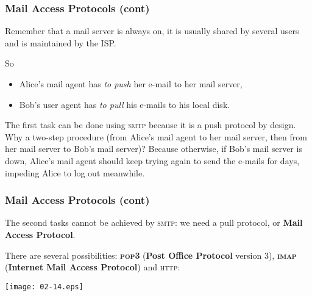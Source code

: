 %
\begin{frame}
\frametitle{Mail Access Protocols (cont)}

Remember that a mail server is always on, it is usually shared by
several users and is maintained by the ISP.

So
\begin{itemize}

  \item Alice's mail agent has \emph{to push} her e-mail to her mail
  server,

  \item Bob's user agent has \emph{to pull} his e-mails to his local
  disk.

\end{itemize}

The first task can be done using \textsc{smtp} because it is a push
protocol by design. Why a two-step procedure (from Alice's mail agent
to her mail server, then from her mail server to Bob's mail server)?
Because otherwise, if Bob's mail server is down, Alice's mail agent
should keep trying again to send the e-mails for days, impeding Alice
to log out meanwhile.

\end{frame}

%
\begin{frame}
\frametitle{Mail Access Protocols (cont)}

The second tasks cannot be achieved by \textsc{smtp}: we need a pull
protocol, or \textbf{Mail Access Protocol}.

There are several possibilities: \textbf{\textsc{pop3}} (\textbf{Post
  Office Protocol} version 3), \textbf{\textsc{imap}}
(\textbf{Internet Mail Access Protocol}) and \textsc{http}:
\begin{center}
\texttt{[image: 02-14.eps]}
\end{center}

\end{frame}

